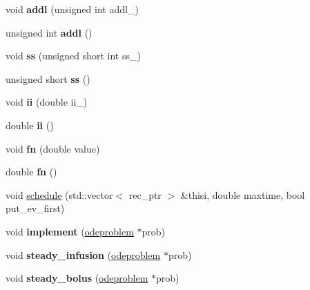\begin{DoxyCompactItemize}
void {\bfseries addl} (unsigned int addl\+\_\+)
\item 
\mbox{\label{classdatarecord_a0f3d274b09fec182b3c8f5e24a91b079}} 
unsigned int {\bfseries addl} ()
\item 
\mbox{\label{classdatarecord_af81453f6f7350faadb3758082bc6fd27}} 
void {\bfseries ss} (unsigned short int ss\+\_\+)
\item 
\mbox{\label{classdatarecord_a564182af517f6571d6f990c4a1b974da}} 
unsigned short {\bfseries ss} ()
\item 
\mbox{\label{classdatarecord_a71cc86723f0fd9f095978dc4fbb717b8}} 
void {\bfseries ii} (double ii\+\_\+)
\item 
\mbox{\label{classdatarecord_aa51651adccbf19a3b1e220d144fe5103}} 
double {\bfseries ii} ()
\item 
\mbox{\label{classdatarecord_a4836c3fac9f5e89c22808ae771cfd5f3}} 
void {\bfseries fn} (double value)
\item 
\mbox{\label{classdatarecord_a6c62192febbc8f23012038ae958b967a}} 
double {\bfseries fn} ()
\item 
void \hyperlink{classdatarecord_aaf2f67fbf31989c3fa6896126ac24ef9}{schedule} (std\+::vector$<$ rec\+\_\+ptr $>$ \&thisi, double maxtime, bool put\+\_\+ev\+\_\+first)
\item 
\mbox{\label{classdatarecord_accb0e06574f1b758342e967049dc47ae}} 
void {\bfseries implement} (\hyperlink{classodeproblem}{odeproblem} $\ast$prob)
\item 
\mbox{\label{classdatarecord_a2e7bd0f299e76d1fd5608a85a73cdbf0}} 
void {\bfseries steady\+\_\+infusion} (\hyperlink{classodeproblem}{odeproblem} $\ast$prob)
\item 
\mbox{\label{classdatarecord_a23944c129303495c6978767f4a03f124}} 
void {\bfseries steady\+\_\+bolus} (\hyperlink{classodeproblem}{odeproblem} $\ast$prob)
\item 
\mbox{\label{classdatarecord_aedab07e4ab4564579f7eb7511d8ac46e}} 

\end{DoxyCompactItemize}
